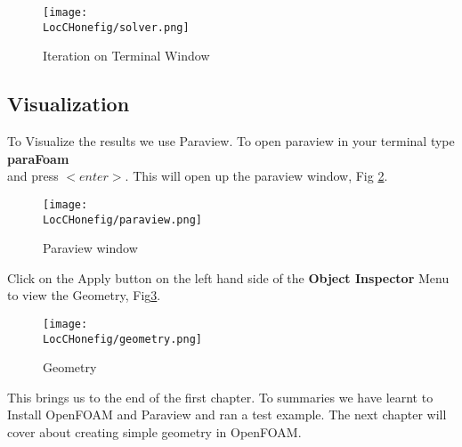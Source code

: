 \begin{figure}[ht]  
\begin{center}  
\texttt{[image: \\LocCHonefig/solver.png]}
\caption{Iteration on Terminal Window}
\label{solver}
\end{center}  
\end{figure}

\subsection*{Visualization}
To Visualize the results we use Paraview. To open paraview in your terminal type \\
\center \textbf{paraFoam} \\
\flushleft and press $<enter>$. This will open up the paraview window, Fig \ref{pv}.

\begin{figure}[ht]  
\begin{center}  
\texttt{[image: \\LocCHonefig/paraview.png]}
\caption{Paraview window}
\label{pv}
\end{center}  
\end{figure}

\flushleft Click on the Apply button on the left hand side of the \textbf{Object Inspector} Menu to view the Geometry, Fig\ref{geom}.

\begin{figure}[ht]  
\begin{center}  
\texttt{[image: \\LocCHonefig/geometry.png]}
\caption{Geometry}
\label{geom}
\end{center}  
\end{figure}

\flushleft This brings us to the end of the first chapter. To summaries we have learnt to Install OpenFOAM and Paraview and ran a test example. 
The next chapter will cover about creating simple geometry in OpenFOAM.
